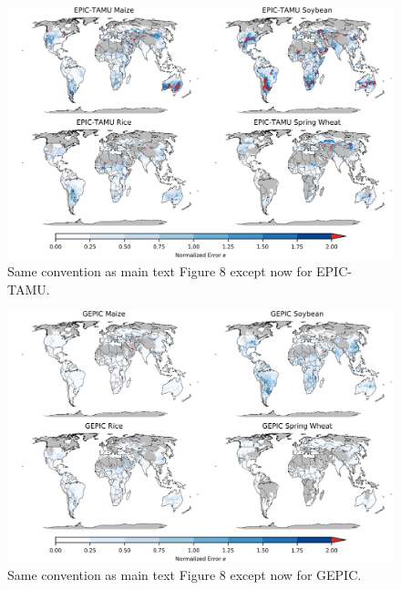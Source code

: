 \documentclass[10pt]{article}
\begin{document}
\begin{figure}[h!]
\centering
\includegraphics[width=15.5cm]{EPIC-TAMU_spatial_error.png}
\caption{Same convention as main text Figure 8 except now for EPIC-TAMU.}
\label{fig:lpjmlnorm}
\end{figure}

\begin{figure}[h!]
\centering
\includegraphics[width=15.5cm]{GEPIC_spatial_error.png}
\caption{Same convention as main text Figure 8 except now for GEPIC.}
\label{fig:lpjmlnorm}
\end{figure}
\end{document}
